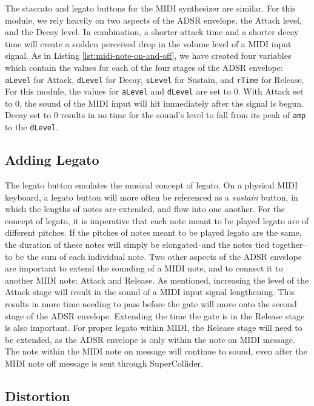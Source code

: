 The staccato and legato buttons for the MIDI synthesizer are similar. For this module, we rely heavily on two aspects of the ADSR envelope, the Attack level, and the Decay level. In combination, a shorter attack time and a shorter decay time will create a sudden perceived drop in the volume level of a MIDI input signal. As in Listing \ref{lst:midi-note-on-and-off}, we have created four variables which contain the values for each of the four stages of the ADSR envelope: \texttt{aLevel} for Attack, \texttt{dLevel} for Decay, \texttt{sLevel} for Sustain, and \texttt{rTime} for Release. For this module, the values for \texttt{aLevel} and \texttt{dLevel} are set to 0. With Attack set to 0, the sound of the MIDI input will hit immediately after the signal is begun. Decay set to 0 results in no time for the sound's level to fall from its peak of \texttt{amp} to the \texttt{dLevel}.

\subsection{Adding Legato}

The legato button emulates the musical concept of legato. On a physical MIDI keyboard, a legato button will more often be referenced as a \textit{sustain} button, in which the lengths of notes are extended, and flow into one another. For the concept of legato, it is imperative that each note meant to be played legato are of different pitches. If the pitches of notes meant to be played legato are the same, the duration of these notes will simply be elongated--and the notes tied together--to be the sum of each individual note. Two other aspects of the ADSR envelope are important to extend the sounding of a MIDI note, and to connect it to another MIDI note: Attack and Release. As mentioned, increasing the level of the Attack stage will result in the sound of a MIDI input signal lengthening. This results in more time needing to pass before the gate will move onto the second stage of the ADSR envelope. Extending the time the gate is in the Release stage is also important. For proper legato within MIDI, the Release stage will need to be extended, as the ADSR envelope is only within the note on MIDI message. The note within the MIDI note on message will continue to sound, even after the MIDI note off message is sent through SuperCollider.


\subsection{Distortion}

